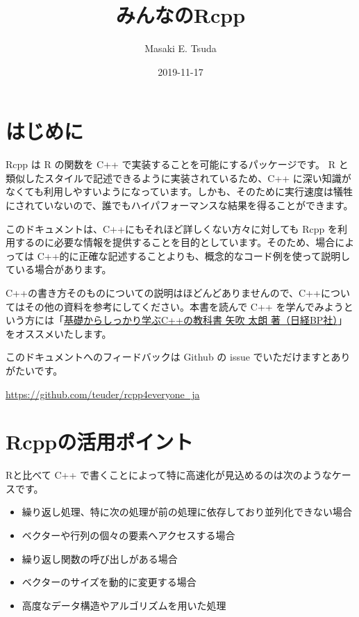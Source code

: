 \documentclass[]{book}
\title{みんなのRcpp}
\author{Masaki E. Tsuda}
\date{2019-11-17}
\providecommand{\tightlist}{%
  \setlength{\itemsep}{0pt}\setlength{\parskip}{0pt}}
\begin{document}
\maketitle

{
\setcounter{tocdepth}{1}
\tableofcontents
}
\chapter*{はじめに}

Rcpp は R の関数を C++ で実装することを可能にするパッケージです。 R と類似したスタイルで記述できるように実装されているため、C++ に深い知識がなくても利用しやすいようになっています。しかも、そのために実行速度は犠牲にされていないので、誰でもハイパフォーマンスな結果を得ることができます。

このドキュメントは、C++にもそれほど詳しくない方々に対しても Rcpp を利用するのに必要な情報を提供することを目的としています。そのため、場合によっては C++的に正確な記述することよりも、概念的なコード例を使って説明している場合があります。

C++の書き方そのものについての説明はほどんどありませんので、C++についてはその他の資料を参考にしてください。本書を読んで C++ を学んでみようという方には「\href{http://www.nikkeibp.co.jp/atclpubmkt/book/17/P98930/}{基礎からしっかり学ぶC++の教科書 矢吹 太朗 著（日経BP社）}」をオススメいたします。

このドキュメントへのフィードバックは Github の issue でいただけますとありがたいです。

\url{https://github.com/teuder/rcpp4everyone_ja}

\hypertarget{rcpp}{%
\chapter{Rcppの活用ポイント}\label{rcpp}}

Rと比べて C++ で書くことによって特に高速化が見込めるのは次のようなケースです。

\begin{itemize}
\tightlist
\item
  繰り返し処理、特に次の処理が前の処理に依存しており並列化できない場合
\item
  ベクターや行列の個々の要素へアクセスする場合
\item
  繰り返し関数の呼び出しがある場合
\item
  ベクターのサイズを動的に変更する場合
\item
  高度なデータ構造やアルゴリズムを用いた処理
\end{itemize}
\end{document}
